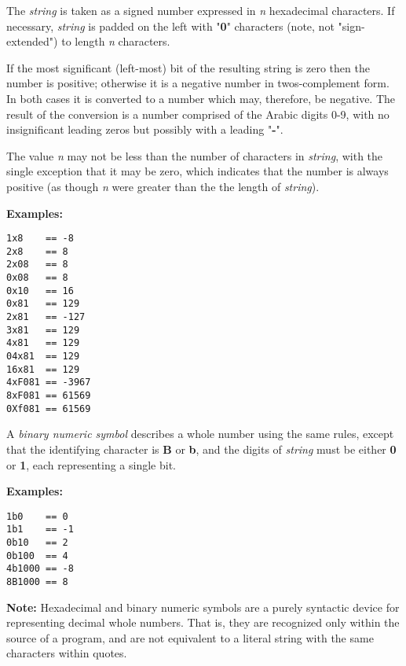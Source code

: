 The \emph{string} is taken as a signed number expressed in
\emph{n} hexadecimal characters.  If necessary, \emph{string} is
padded on the left with "\textbf{0}" characters (note, not
"sign-extended") to length \emph{n} characters.
 
If the most significant (left-most) bit of the resulting string is zero
then the number is positive; otherwise it is a negative number in
twos-complement form.  In both cases it is converted to a \nr{} number
which may, therefore, be negative.  The result of the conversion is a
number comprised of the Arabic digits 0-9, with no insignificant leading
zeros but possibly with a leading "\textbf{-}".
 
The value \emph{n} may not be less than the number of characters in
\emph{string}, with the single exception that it may be zero, which
indicates that the number is always positive (as though \emph{n}
were greater than the the length of \emph{string}).
 
\textbf{Examples:}
\begin{lstlisting}
1x8    == -8
2x8    == 8
2x08   == 8
0x08   == 8
0x10   == 16
0x81   == 129
2x81   == -127
3x81   == 129
4x81   == 129
04x81  == 129
16x81  == 129
4xF081 == -3967
8xF081 == 61569
0Xf081 == 61569
\end{lstlisting}
 
A \emph{binary numeric symbol} describes a whole number using the
same rules, except that the identifying character is \textbf{B}
or \textbf{b}, and the digits of \emph{string} must be
either \textbf{0} or \textbf{1}, each representing a single bit.
 
\textbf{Examples:}
\begin{lstlisting}
1b0    == 0
1b1    == -1
0b10   == 2
0b100  == 4
4b1000 == -8
8B1000 == 8
\end{lstlisting}
\textbf{Note: }Hexadecimal and binary numeric symbols are a purely syntactic
device for representing decimal whole numbers.  That is, they are
recognized only within the source of a \nr{} program, and are not
equivalent to a literal string with the same characters within quotes.
